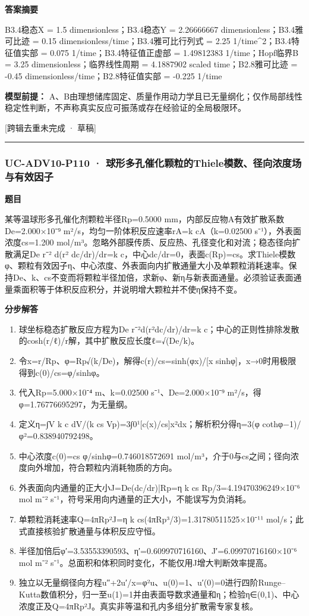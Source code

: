\documentclass[UTF8,11pt,a4paper]{ctexart}
\begin{document}
\noindent\textbf{答案摘要}\par
B3.4稳态X = 1.5 dimensionless；B3.4稳态Y = 2.26666667 dimensionless；B3.4雅可比迹 = 0.15 dimensionless/time；B3.4雅可比行列式 = 2.25 1/time\textasciicircum{}2；B3.4特征值实部 = 0.075 1/time；B3.4特征值正虚部 = 1.49812383 1/time；Hopf临界B = 3.25 dimensionless；临界线性周期 = 4.1887902 scaled time；B2.8雅可比迹 = -0.45 dimensionless/time；B2.8特征值实部 = -0.225 1/time\par
\noindent\textbf{模型前提：}
A、B由理想储库固定、质量作用动力学且已无量纲化；仅作局部线性稳定性判断，不声称真实反应可振荡或存在经验证的全局极限环。\par
\noindent\textcolor{red!65!black}{[跨辑去重未完成 · 草稿]} \par
\medskip\hrule\medskip
{}
\subsubsection*{UC-ADV10-P110 · 球形多孔催化颗粒的Thiele模数、径向浓度场与有效因子}
\noindent\textbf{题目}\par
某等温球形多孔催化剂颗粒半径Rp=0.5000 mm，内部反应物A有效扩散系数De=2.000×10⁻⁹ m²/s，均匀一阶体积反应速率rA=k cA（k=0.02500 s⁻¹），外表面浓度cs=1.200 mol/m³。忽略外部膜传质、反应热、孔径变化和对流；稳态径向扩散满足De r⁻² d(r² dc/dr)/dr=k c，中心dc/dr=0，表面c(Rp)=cs。求Thiele模数φ、颗粒有效因子η、中心浓度、外表面向内扩散通量大小及单颗粒消耗速率。保持De、k、cs不变而将颗粒半径加倍，求新φ、新η与新表面通量。必须验证表面通量乘面积等于体积反应积分，并说明增大颗粒并不使η保持不变。\par
\medskip\noindent\textbf{分步解答}
\begin{enumerate}
\item 球坐标稳态扩散反应方程为De r⁻²d(r²dc/dr)/dr=k c；中心的正则性排除发散的cosh(r/ℓ)/r解，其中扩散反应长度ℓ=√(De/k)。
\item 令x=r/Rp、φ=Rp√(k/De)，解得c(r)/cs=sinh(φx)/[x sinhφ]，x→0时用极限得到c(0)/cs=φ/sinhφ。
\item 代入Rp=5.000×10⁻⁴ m、k=0.02500 s⁻¹、De=2.000×10⁻⁹ m²/s，得φ=1.76776695297，为无量纲。
\item 定义η=∫V k c dV/(k cs Vp)=3∫0¹[c(x)/cs]x²dx；解析积分得η=3(φ cothφ−1)/φ²=0.838940792498。
\item 中心浓度c(0)=cs φ/sinhφ=0.746018572691 mol/m³，介于0与cs之间；径向浓度向外增加，符合颗粒内消耗物质的方向。
\item 外表面向内通量的正大小J=De(dc/dr)|Rp=η k cs Rp/3=4.19470396249×10⁻⁶ mol m⁻² s⁻¹，符号采用向内通量的正大小，不能误写为负消耗。
\item 单颗粒消耗速率Q=4πRp²J=η k cs(4πRp³/3)=1.31780511525×10⁻¹¹ mol/s；此式直接核验扩散通量与体积反应守恒。
\item 半径加倍后φ′=3.53553390593、η′=0.609970716160、J′=6.09970716160×10⁻⁶ mol m⁻² s⁻¹。总面积和体积同时变化，不能仅用J增大判断效率提高。
\item 独立以无量纲径向方程u″+2u′/x=φ²u、u(0)=1、u′(0)=0进行四阶Runge–Kutta数值积分，归一至u(1)=1并由表面导数求通量和η；检验η∈(0,1)、中心浓度正及Q=4πRp²J。真实非等温和孔内多组分扩散需专家复核。
\end{enumerate}
\end{document}
